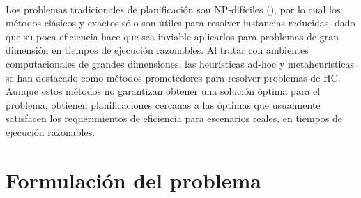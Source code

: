\paragraph{}Los problemas tradicionales de planificación son NP-difíciles (\citet{bib-garey}), por lo cual los métodos clásicos y exactos sólo son útiles para resolver instancias reducidas, dado que su poca eficiencia hace que sea inviable aplicarlos para problemas de gran dimensión en tiempos de ejecución razonables.
Al tratar con ambientes computacionales de grandes dimensiones, las heurísticas ad-hoc y metaheurísticas se han destacado como métodos prometedores para resolver problemas de HC.
Aunque estos métodos no garantizan obtener una solución óptima para el problema, obtienen planificaciones cercanas a las óptimas que usualmente satisfacen los requerimientos de eficiencia para escenarios reales, en tiempos de ejecución razonables.

\section{Formulación del problema} \label{section:descripcion-problema,subsection:formulacion-problema}

